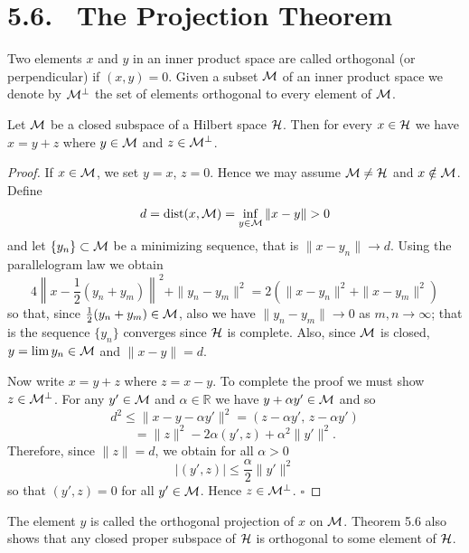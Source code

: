 \section*{5.6. \ The Projection Theorem}

\begin{definition}\label{gt.def5.6.orthogonal}
Two elements $x$ and $y$ in an inner product space are called orthogonal (or perpendicular) if $(x,y)=0$. Given a subset $\mathcal{M}$ of an inner product space we denote by $\mathcal{M}^\perp$ the set of elements orthogonal to every element of $\mathcal{M}$.
\end{definition}

\begin{theorem}\label{gt.thm5.6}
Let $\mathcal{M}$ be a closed subspace of a Hilbert space $\mathcal{H}$. Then for every $x\in\mathcal{H}$ we have $x=y+z$ where $y\in\mathcal{M}$ and $z\in\mathcal{M}^\perp$.
\end{theorem}

\begin{proof}
If $x\in\mathcal{M}$, we set $y=x$, $z=0$. Hence we may assume $\mathcal{M}\neq \mathcal{H}$ and $x\notin\mathcal{M}$. Define
\[
d=\dist(x,\M)=\inf_{y\in\M}\|x-y\|>0
\]
and let $\{y_n\}\subset\mathcal{M}$ be a minimizing sequence, that is $\|x-y_n\|\to d$. Using the parallelogram law we obtain
\[
4\left\|x-\frac{1}{2}(y_n+y_m)\right\|^2+\|y_n-y_m\|^2=2\left(\|x-y_n\|^2+\|x-y_m\|^2\right)
\]
so that, since $\frac{1}{2}(y_n+y_m)\in\mathcal{M}$, also we have $\|y_n-y_m\|\to 0$ as $m,n\to\infty$; that is the sequence $\{y_n\}$ converges since $\mathcal{H}$ is complete. Also, since $\mathcal{M}$ is closed, $y=\lim y_n\in\mathcal{M}$ and $\|x-y\|=d$.

Now write $x=y+z$ where $z=x-y$. To complete the proof we must show $z\in\mathcal{M}^\perp$. For any $y'\in\mathcal{M}$ and $\alpha\in\mathbb{R}$ we have $y+\alpha y'\in\mathcal{M}$ and so
\[
d^2\le \|x-y-\alpha y'\|^2=(z-\alpha y',\,z-\alpha y')
\]
\[
=\|z\|^2-2\alpha (y',z)+\alpha^2\|y'\|^2.
\]
Therefore, since $\|z\|=d$, we obtain for all $\alpha>0$
\[
|(y',z)|\le \frac{\alpha}{2}\|y'\|^2
\]
so that $(y',z)=0$ for all $y'\in\mathcal{M}$. Hence $z\in\mathcal{M}^\perp$. $\square$
\end{proof}

\begin{remark}
The element $y$ is called the orthogonal projection of $x$ on $\mathcal{M}$. Theorem 5.6 also shows that any closed proper subspace of $\mathcal{H}$ is orthogonal to some element of $\mathcal{H}$.
\end{remark}

